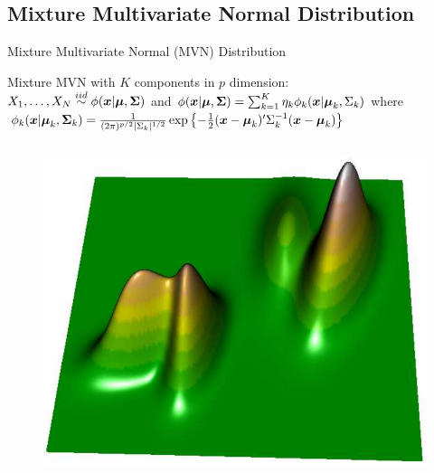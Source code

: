 \documentclass{beamer}
\begin{document}
\subsection{Mixture Multivariate Normal Distribution}

\begin{frame}{Mixture Multivariate Normal (MVN) Distribution}

Mixture MVN with $K$ components in $p$ dimension: \\
$X_1, \ldots, X_N \stackrel{iid}{\sim}
\phi(\boldsymbol{x} | \boldsymbol{\mu}, \boldsymbol{\Sigma})$
and
$
\phi(\boldsymbol{x}| \boldsymbol{\mu}, \boldsymbol{\Sigma})
= \sum_{k = 1}^K \eta_k \phi_k(\boldsymbol{x}| \boldsymbol{\mu}_k, \Sigma_k)
$
where
$
\phi_k(\boldsymbol{x} | \boldsymbol{\mu}_k, \boldsymbol{\Sigma}_k)
=
\frac{1}{(2\pi)^{p/2} |\Sigma_k|^{1/2}}
\exp\left\{-\frac{1}{2}
(\boldsymbol{x} - \boldsymbol{\mu}_k)^\prime \Sigma_k^{-1} (\boldsymbol{x} - \boldsymbol{\mu}_k)
\right\}
$

\vspace{-0.7cm}

\begin{columns}

\begin{column}{0.55\textwidth}
  \begin{figure}
  \includegraphics[width=\textwidth]{./graph/mixmvn_new}
  \end{figure}
\end{column}

\hspace{-0.3cm}


\end{columns}
\end{frame}
\end{document}
